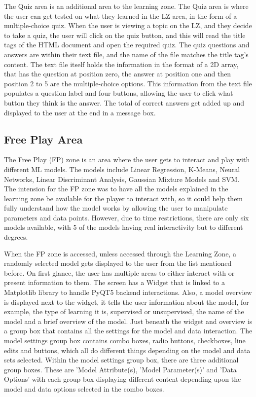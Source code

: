 		The Quiz area is an additional area to the learning zone. The Quiz area is where the user can get tested on what they learned in the LZ area, in the form of a multiple-choice quiz. When the user is viewing a topic on the LZ, and they decide to take a quiz, the user will click on the quiz button, and this will read the title tags of the HTML document and open the required quiz. The quiz questions and answers are within their text file, and the name of the file matches the title tag's content. The text file itself holds the information in the format of a 2D array, that has the question at position zero, the answer at position one and then position 2 to 5 are the multiple-choice options. This information from the text file populates a question label and four buttons, allowing the user to click what button they think is the answer. The total of correct answers get added up and displayed to the user at the end in a message box.
	
	\subsection{Free Play Area}
	
		The Free Play (FP) zone is an area where the user gets to interact and play with different ML models. The models include Linear Regression, K-Means, Neural Networks, Linear Discriminant Analysis, Gaussian Mixture Models and SVM. The intension for the FP zone was to have all the models explained in the learning zone be available for the player to interact with, so it could help them fully understand how the model works by allowing the user to manipulate parameters and data points. However, due to time restrictions, there are only six models available, with 5 of the models having real interactivity but to different degrees.
		
		When the FP zone is accessed, unless accessed through the Learning Zone, a randomly selected model gets displayed to the user from the list mentioned before. On first glance, the user has multiple areas to either interact with or present information to them. The screen has a Widget that is linked to a Matplotlib library to handle PyQT5 backend interactions. Also, a model overview is displayed next to the widget, it tells the user information about the model, for example, the type of learning it is, supervised or unsupervised, the name of the model and a brief overview of the model. Just beneath the widget and overview is a group box that contains all the settings for the model and data interaction. The model settings group box contains combo boxes, radio buttons, checkboxes,  line edits and buttons, which all do different things depending on the model and data sets selected. Within the model settings group box, there are three additional group boxes. These are 'Model Attribute(s), 'Model Parameter(s)' and 'Data Options' with each group box displaying different content depending upon the model and data options selected in the combo boxes.
		
